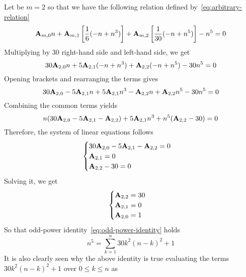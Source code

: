 \begin{examp}
    Let be $m=2$ so that we have the following relation defined by~\eqref{eq:arbitrary-relation}
    \begin{equation*}
        {\mathbf{A}} \sb{m,0} n
        + {\mathbf{A}} \sb{m,1} \left[ \frac{1}{6} (-n + n^3) \right]
        + {\mathbf{A}} \sb{m,2} \left[ \frac{1}{30} (-n + n^5) \right] - n^5 = 0
    \end{equation*}
    Multiplying by $30$ right-hand side and left-hand side, we get
    \begin{equation*}
        30 {\mathbf{A}} \sb{2,0} n + 5 {\mathbf{A}} \sb{2,1} (-n + n^3) + {\mathbf{A}} \sb{2,2} (-n + n^5) - 30n^5 = 0
    \end{equation*}
    Opening brackets and rearranging the terms gives
    \begin{equation*}
        30 {\mathbf{A}} \sb{2,0} - 5 {\mathbf{A}} \sb{2,1} n + 5 {\mathbf{A}} \sb{2,1} n^3 - {\mathbf{A}} \sb{2,2} n + {\mathbf{A}} \sb{2,2} n^5 - 30n^5 = 0
    \end{equation*}
    Combining the common terms yields
    \begin{equation*}
        n (30 {\mathbf{A}} \sb{2,0} - 5 {\mathbf{A}} \sb{2,1} - {\mathbf{A}} \sb{2,2}) + 5 {\mathbf{A}} \sb{2,1} n^3 + n^5 ({\mathbf{A}} \sb{2,2} - 30) = 0
    \end{equation*}
    Therefore, the system of linear equations follows
    \begin{equation*}
        \begin{cases}
            30 {\mathbf{A}} \sb{2,0} - 5 {\mathbf{A}} \sb{2,1} - {\mathbf{A}} \sb{2,2} = 0 \\
            {\mathbf{A}} \sb{2,1} = 0 \\
            {\mathbf{A}} \sb{2,2} - 30 = 0
        \end{cases}
    \end{equation*}
    Solving it, we get
    \begin{equation*}
        \begin{cases}
            {\mathbf{A}} \sb{2,2} = 30 \\
            {\mathbf{A}} \sb{2,1} = 0 \\
            {\mathbf{A}} \sb{2,0} = 1
        \end{cases}
    \end{equation*}
    So that odd-power identity~\eqref{eq:odd-power-identity} holds
    \begin{equation*}
        n^5 = \sum_{k=1}^{n} 30k^2(n-k)^2 + 1
    \end{equation*}
    It is also clearly seen
    why the above identity is true evaluating the terms $30k^2(n-k)^2 + 1$ over $0 \leq k \leq n$ as

\end{examp}
